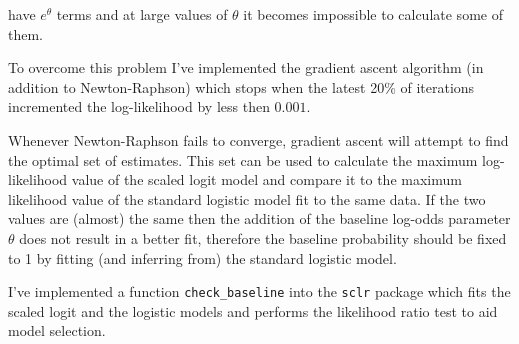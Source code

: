 \documentclass[]{article}
\begin{document}
have \(e^\theta\) terms and at large values of \(\theta\) it becomes impossible to calculate some of them.

To overcome this problem I've implemented the gradient ascent algorithm (in addition to Newton-Raphson) which stops when the latest 20\% of iterations incremented the log-likelihood by less then \(0.001\).

Whenever Newton-Raphson fails to converge, gradient ascent will attempt to find the optimal set of estimates. This set can be used to calculate the maximum log-likelihood value of the scaled logit model and compare it to the maximum likelihood value of the standard logistic model fit to the same data. If the two values are (almost) the same then the addition of the baseline log-odds parameter \(\theta\) does not result in a better fit, therefore the baseline probability should be fixed to 1 by fitting (and inferring from) the standard logistic model.

I've implemented a function \texttt{check\_baseline} into the \texttt{sclr} package which fits the scaled logit and the logistic models and performs the likelihood ratio test to aid model selection.
\end{document}
